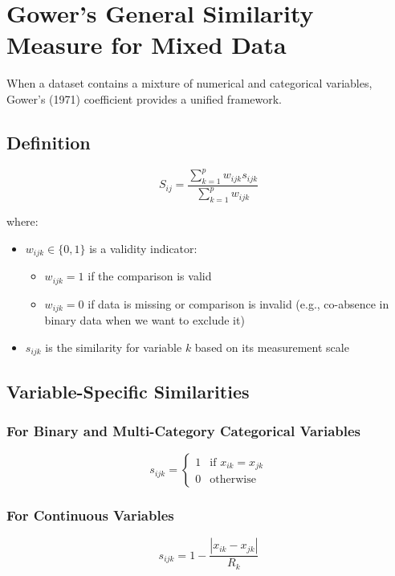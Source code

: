 \documentclass[11pt]{article}
\begin{document}
\section{Gower's General Similarity Measure for Mixed Data}

When a dataset contains a mixture of numerical and categorical variables, Gower's (1971) coefficient provides a unified framework.

\subsection{Definition}

$$S_{ij} = \frac{\sum_{k=1}^{p} w_{ijk} s_{ijk}}{\sum_{k=1}^{p} w_{ijk}}$$

where:
\begin{itemize}
    \item $w_{ijk} \in \{0, 1\}$ is a validity indicator:
    \begin{itemize}
        \item $w_{ijk} = 1$ if the comparison is valid
        \item $w_{ijk} = 0$ if data is missing or comparison is invalid (e.g., co-absence in binary data when we want to exclude it)
    \end{itemize}
    \item $s_{ijk}$ is the similarity for variable $k$ based on its measurement scale
\end{itemize}

\subsection{Variable-Specific Similarities}

\subsubsection{For Binary and Multi-Category Categorical Variables}

$$s_{ijk} = \begin{cases} 1 & \text{if } x_{ik} = x_{jk} \\ 0 & \text{otherwise} \end{cases}$$

\subsubsection{For Continuous Variables}

$$s_{ijk} = 1 - \frac{|x_{ik} - x_{jk}|}{R_k}$$
\end{document}
